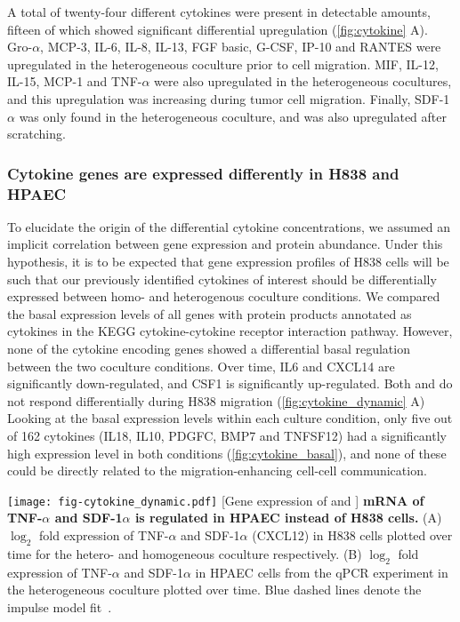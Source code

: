 A total of twenty-four different cytokines were present in detectable amounts,
fifteen of which showed significant differential upregulation
(\ref{fig:cytokine} A).
Gro-$\alpha$, MCP-3, IL-6, IL-8, IL-13, FGF basic, G-CSF, IP-10 and RANTES were
upregulated in the heterogeneous coculture prior to cell migration.
MIF, IL-12, IL-15, MCP-1 and TNF-$\alpha$ were also upregulated
in the heterogeneous cocultures, and this upregulation was increasing
during tumor cell migration.
Finally, SDF-1$\alpha$ was only found in the heterogeneous coculture,
and was also upregulated after scratching. 

\subsubsection{Cytokine genes are expressed differently in H838 and HPAEC}

To elucidate the origin of the differential cytokine concentrations,
we assumed an implicit correlation between gene expression and protein abundance.
Under this hypothesis, it is to be expected that gene expression profiles of
H838 cells will be such that 
our previously identified cytokines of interest should be differentially 
expressed between homo- and heterogenous coculture conditions.
We compared the basal 
expression levels of all genes with protein products
annotated as cytokines in the KEGG cytokine-cytokine receptor interaction pathway. 
However, none of the cytokine encoding genes 
showed a differential basal regulation between the two coculture conditions. Over time, IL6 and CXCL14 are significantly
down-regulated, and CSF1 is significantly up-regulated. 
Both \tnfa and \sdfonea do
not respond differentially during H838 migration (\ref{fig:cytokine_dynamic} A)
Looking at the basal expression levels within each culture condition, only five out of 162 cytokines (IL18, IL10, PDGFC, BMP7 and TNFSF12) 
had a significantly high expression level in both conditions
(\ref{fig:cytokine_basal}), 
and none of these could be directly related to the migration-enhancing 
cell-cell communication.

\begin{center}
\captionsetup{labelformat=prepage}
\texttt{[image: fig-cytokine\_dynamic.pdf]}
\newpage
[Gene expression of \tnfa and \sdfonea]{
{\bf mRNA of TNF-$\alpha$ and SDF-1$\alpha$ is regulated in HPAEC instead of H838 
cells.}
(A) $\log_2$ fold expression of TNF-$\alpha$ and SDF-1$\alpha$ (CXCL12) in H838 
cells plotted
over time for the hetero- and homogeneous coculture respectively.
(B) $\log_2$ fold expression of TNF-$\alpha$ and SDF-1$\alpha$ in HPAEC cells 
from the qPCR
experiment in the heterogeneous coculture plotted
over time. Blue dashed lines denote the impulse model fit~\cite{Chechik2009}.
}
\label{fig:cytokine_dynamic}
\end{center}


